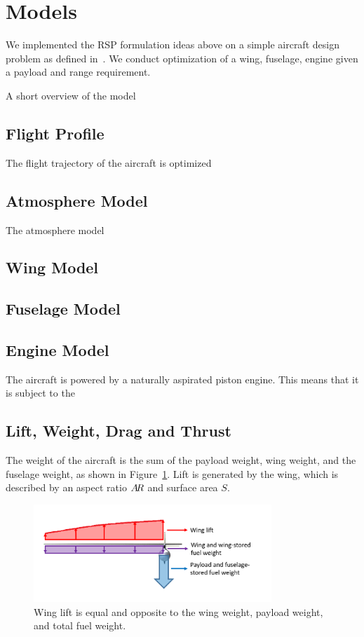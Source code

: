 \section{Models}

We implemented the RSP formulation ideas above on a simple aircraft design problem as defined in~\cite{Ozturk2018}.
We conduct optimization of a wing, fuselage, engine given a payload and range requirement.

A short overview of the model

\subsection{Flight Profile}

The flight trajectory of the aircraft is optimized

\subsection{Atmosphere Model}

The atmosphere model

\subsection{Wing Model}

\subsection{Fuselage Model}



\subsection{Engine Model}

The aircraft is powered by a naturally aspirated piston engine. This means that it is subject to the


\subsection{Lift, Weight, Drag and Thrust}

The weight of the aircraft is the sum of the payload weight, wing weight, and
the fuselage weight, as shown in Figure~\ref{fig:liftweight}. Lift is generated by the wing,
which is described by an aspect ratio $A\!R$ and surface area $S$.

\begin{figure}
\centering
\caption{\label{fig:liftweight} Wing lift is equal and opposite to the wing weight, payload weight, and total fuel weight.}
\includegraphics[width=0.8\textwidth]{liftweight.PNG}
\end{figure}

